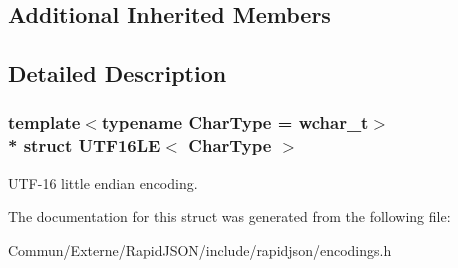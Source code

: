 \subsection*{Additional Inherited Members}


\subsection{Detailed Description}
\subsubsection*{template$<$typename Char\+Type = wchar\+\_\+t$>$\\*
struct U\+T\+F16\+L\+E$<$ Char\+Type $>$}

U\+T\+F-\/16 little endian encoding. 

The documentation for this struct was generated from the following file\+:\begin{DoxyCompactItemize}
\item 
Commun/\+Externe/\+Rapid\+J\+S\+O\+N/include/rapidjson/encodings.\+h\end{DoxyCompactItemize}
